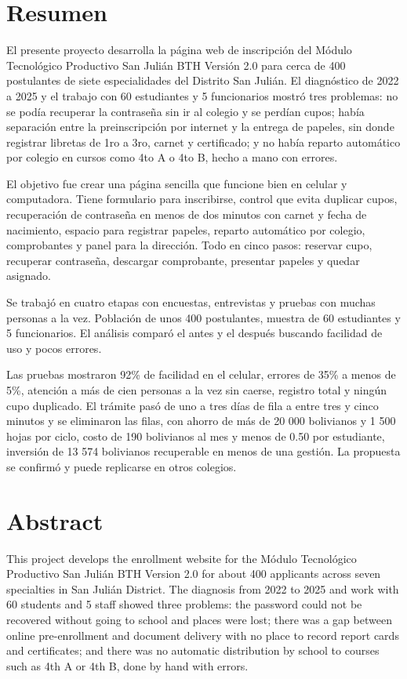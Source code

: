 \section*{Resumen}

El presente proyecto desarrolla la página web de inscripción del Módulo Tecnológico Productivo San Julián BTH Versión 2.0 para cerca de 400 postulantes de siete especialidades del Distrito San Julián. El diagnóstico de 2022 a 2025 y el trabajo con 60 estudiantes y 5 funcionarios mostró tres problemas: no se podía recuperar la contraseña sin ir al colegio y se perdían cupos; había separación entre la preinscripción por internet y la entrega de papeles, sin donde registrar libretas de 1ro a 3ro, carnet y certificado; y no había reparto automático por colegio en cursos como 4to A o 4to B, hecho a mano con errores.

El objetivo fue crear una página sencilla que funcione bien en celular y computadora. Tiene formulario para inscribirse, control que evita duplicar cupos, recuperación de contraseña en menos de dos minutos con carnet y fecha de nacimiento, espacio para registrar papeles, reparto automático por colegio, comprobantes y panel para la dirección. Todo en cinco pasos: reservar cupo, recuperar contraseña, descargar comprobante, presentar papeles y quedar asignado.

Se trabajó en cuatro etapas con encuestas, entrevistas y pruebas con muchas personas a la vez. Población de unos 400 postulantes, muestra de 60 estudiantes y 5 funcionarios. El análisis comparó el antes y el después buscando facilidad de uso y pocos errores.

Las pruebas mostraron 92\% de facilidad en el celular, errores de 35\% a menos de 5\%, atención a más de cien personas a la vez sin caerse, registro total y ningún cupo duplicado. El trámite pasó de uno a tres días de fila a entre tres y cinco minutos y se eliminaron las filas, con ahorro de más de 20 000 bolivianos y 1 500 hojas por ciclo, costo de 190 bolivianos al mes y menos de 0.50 por estudiante, inversión de 13 574 bolivianos recuperable en menos de una gestión. La propuesta se confirmó y puede replicarse en otros colegios.


\newpage

\section*{Abstract}
This project develops the enrollment website for the Módulo Tecnológico Productivo San Julián BTH Version 2.0 for about 400 applicants across seven specialties in San Julián District. The diagnosis from 2022 to 2025 and work with 60 students and 5 staff showed three problems: the password could not be recovered without going to school and places were lost; there was a gap between online pre-enrollment and document delivery with no place to record report cards and certificates; and there was no automatic distribution by school to courses such as 4th A or 4th B, done by hand with errors.

